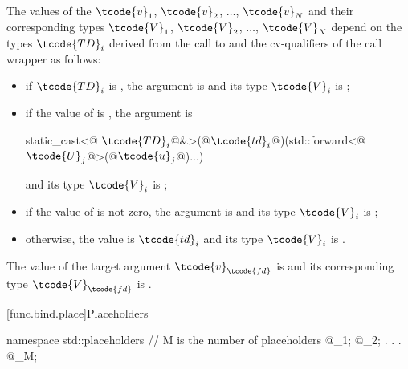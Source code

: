 \pnum
{}%
The values of the  $\tcode{v}_1$, $\tcode{v}_2$, $\dotsc$, $\tcode{v}_N$ and their
corresponding types $\tcode{V}_1$, $\tcode{V}_2$, $\dotsc$, $\tcode{V}_N$ depend on the
types $\tcode{TD}_i$ derived from
the call to  and the
cv-qualifiers \cv{} of the call wrapper  as follows:
\begin{itemize}
\item if $\tcode{TD}_i$ is , the
argument is  and its type $\tcode{V}_i$ is ;

\item if the value of 
is , the argument is
\begin{codeblock}
static_cast<@\cv{} $\tcode{TD}_i$@&>(@$\tcode{td}_i$@)(std::forward<@$\tcode{U}_j$@>(@$\tcode{u}_j$@)...)
\end{codeblock}
and its type $\tcode{V}_i$ is
;

\item if the value  of 
is not zero, the  argument is 
and its type $\tcode{V}_i$
is ;

\item otherwise, the value is $\tcode{td}_i$ and its type $\tcode{V}_i$
is .
\end{itemize}

\pnum
The value of the target argument $\tcode{v}_\tcode{fd}$ is  and
its corresponding type $\tcode{V}_\tcode{fd}$ is .
%

[func.bind.place]{Placeholders}

%
%
%
%
%
%
%
%
%
%
%
\begin{codeblock}
namespace std::placeholders {
  // M is the number of placeholders
  @\seebelow@ _1;
  @\seebelow@ _2;
              .
              .
              .
  @\seebelow@ _M;
}
\end{codeblock}

